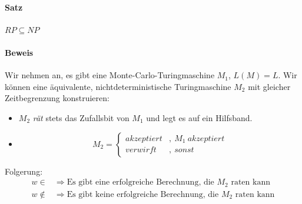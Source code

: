 \paragraph{Satz}
$RP \subseteq NP$

\paragraph{Beweis}
Wir nehmen an, es gibt eine Monte-Carlo-Turingmaschine $M_1$, $L(M) = L$.
Wir können eine äquivalente, nichtdeterministische Turingmaschine $M_2$ mit gleicher Zeitbegrenzung konstruieren:
\begin{itemize}
	\item $M_2$ \emph{rät} stets das Zufallsbit von $M_1$ und legt es auf ein Hilfsband.
	\item \begin{equation*}
		M_2 =
		\begin{cases}
			akzeptiert &,\ M_1\ akzeptiert\\
			verwirft &,\ sonst
		\end{cases}
	\end{equation*}
\end{itemize}
Folgerung:
\begin{align*}
	w \in &\Rightarrow \text{Es gibt eine erfolgreiche Berechnung, die }M_2\text{ raten kann}\\
	w \notin &\Rightarrow \text{Es gibt keine erfolgreiche Berechnung, die }M_2\text{ raten kann}
\end{align*}